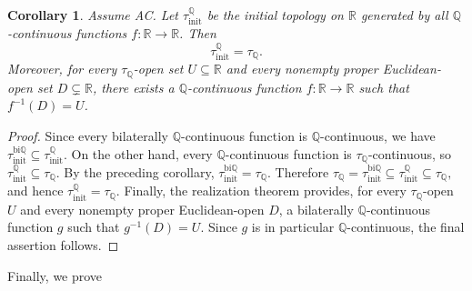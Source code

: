 \documentclass[11pt]{amsart} %
\newtheorem{corollary}[theorem]{Corollary}
\theoremstyle{definition}
\newcommand{\Q}{\mathbb{Q}}
\begin{document}
\begin{corollary}
\label{cor:5.15}
Assume AC. 
Let $\tau_{\mathrm{init}}^{\mathbb{Q}}$ be the initial topology on $\mathbb{R}$ generated by all $\mathbb{Q}$-continuous functions $f:\mathbb{R}\rightarrow\mathbb{R}$. Then
\begin{equation} 
\tau_{\mathrm{init}}^{\mathbb{Q}}=\tau_{\Q}. \end{equation} 
Moreover, for every $\tau_{\Q}$-open set $U\subseteq\mathbb{R}$ and every nonempty proper Euclidean-open set $D\subsetneq\mathbb{R}$, there exists a $\mathbb{Q}$-continuous function $f:\mathbb{R}\rightarrow\mathbb{R}$ such that $f^{-1}(D)=U$.
\end{corollary}
\begin{proof}
Since every bilaterally $\mathbb{Q}$-continuous function is $\mathbb{Q}$-continuous, we have
$ \tau_{\mathrm{init}}^{\mathrm{bi}\mathbb{Q}}\subseteq\tau_{\mathrm{init}}^{\mathbb{Q}}. $
On the other hand, every $\mathbb{Q}$-continuous function is $\tau_{\Q}$-continuous, so
$ \tau_{\mathrm{init}}^{\mathbb{Q}}\subseteq\tau_{\Q}. $
By the preceding corollary,
$ \tau_{\mathrm{init}}^{\mathrm{bi}\mathbb{Q}}=\tau_{\Q}.$
Therefore
$\tau_{\Q}=\tau_{\mathrm{init}}^{\mathrm{bi}\mathbb{Q}}\subseteq\tau_{\mathrm{init}}^{\mathbb{Q}}\subseteq\tau_{\Q},$
and hence
$\tau_{\mathrm{init}}^{\mathbb{Q}}=\tau_{\Q}. $
Finally, the realization theorem provides, for every $\tau_{\Q}$-open $U$ and every nonempty proper Euclidean-open $D$, a bilaterally $\mathbb{Q}$-continuous function $g$ such that $g^{-1}(D)=U$. Since $g$ is in particular $\mathbb{Q}$-continuous, the final assertion follows.
\end{proof}

Finally, we prove
\end{document}
